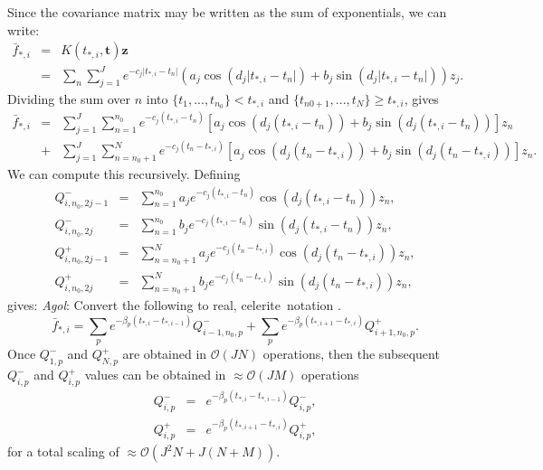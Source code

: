 \documentclass[manuscript, letterpaper]{aastex6}
\newcommand{\project}[1]{\textsf{#1}}
\newcommand{\celerite}{\project{celerite}}
\newcommand{\bvec}[1]{{\ensuremath{\boldsymbol{#1}}}}
\newcommand{\todo}[3]{{\color{#2}\emph{#1}: #3}}
\newcommand{\agoltodo}[1]{\todo{Agol}{blue}{#1}}
\begin{document}
Since the covariance matrix may be written as the sum of exponentials, we can write:
\begin{eqnarray}
\bar f_{*,i} &=& K(t_{*,i},\bvec{t}) \bvec{z} \\
&=& \sum_n \sum_{j=1}^J e^{-c_j \vert t_{*,i}-t_n\vert}\left(a_j \cos{(d_j \vert t_{*,i}-t_n\vert)} +b_j \sin{(d_j \vert t_{*,i}-t_n\vert)}\right) z_j.
\end{eqnarray}
Dividing the sum over $n$ into $\{t_1,...,t_{n_0}\} < t_{*,i}$ and
$\{t_{n0+1},...,t_N\} \ge t_{*,i}$, gives
\begin{eqnarray}
\bar f_{*,i} &=& \sum_{j=1}^J\sum_{n=1}^{n_0} e^{-c_j(t_{*,i}-t_n)} \left[a_j \cos{(d_j(t_{*,i}-t_n))}+b_j\sin{(d_j(t_{*,i}-t_n))}\right] z_n \\
&+& \sum_{j=1}^J\sum_{n=n_0+1}^N  e^{-c_j(t_n-t_{*,i})} \left[a_j \cos{(d_j(t_n-t_{*,i}))}+b_j\sin{(d_j(t_n-t_{*,i}))}\right] z_n.
\end{eqnarray}
We can compute this recursively.  Defining
\begin{eqnarray}
Q^-_{i,n_0,2j-1} &=& \sum_{n=1}^{n_0} a_j e^{-c_j(t_{*,i}-t_n)} \cos{(d_j(t_{*,i}-t_n))} z_n,\\
Q^-_{i,n_0,2j} &=& \sum_{n=1}^{n_0} b_j e^{-c_j(t_{*,i}-t_n)} \sin{(d_j(t_{*,i}-t_n))} z_n,\\
Q^+_{i,n_0,2j-1} &=& \sum_{n=n_0+1}^N a_j e^{-c_j(t_n-t_{*,i})}\cos{(d_j(t_n-t_{*,i}))} z_n,\\
Q^+_{i,n_0,2j} &=& \sum_{n=n_0+1}^N b_j e^{-c_j(t_n-t_{*,i})} \sin{(d_j(t_n-t_{*,i}))} z_n,
\end{eqnarray} gives:
\agoltodo{Convert the following to real, \celerite\ notation .}
\begin{equation}
\bar f_{*,i} = \sum_p e^{-\beta_p (t_{*,i}-t_{*,i-1})} Q^-_{i-1,n_0,p} + \sum_p e^{-\beta_p (t_{*,i+1}-t_{*,i})} Q^+_{i+1,n_0,p}.
\end{equation}
Once $Q^-_{1,p}$ and $Q^+_{N,p}$ are obtained in $\mathcal{O}(JN)$ operations, then the subsequent $Q^-_{i,p}$ and $Q^+_{i,p}$ values can be obtained in $\approx \mathcal{O}(JM)$ operations
\begin{eqnarray}
Q^-_{i,p} &=& e^{-\beta_p (t_{*,i}-t_{*,i-1})} Q^-_{i,p},\\
Q^+_{i,p} &=& e^{-\beta_p (t_{*,i+1}-t_{*,i})} Q^+_{i,p},
\end{eqnarray}
for a total scaling of $\approx \mathcal{O}(J^2N+J(N+M))$.
\end{document}
